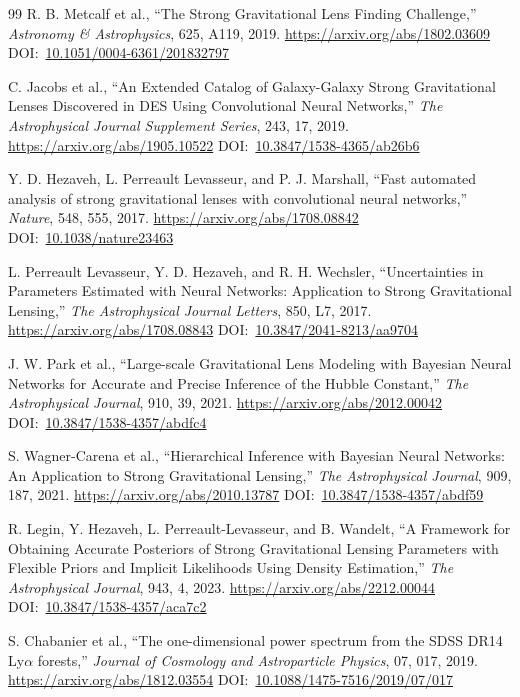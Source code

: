 \documentclass[10pt,onecolumn]{article}
\newcommand{\doi}[1]{DOI:~\href{https://doi.org/#1}{#1}}
\begin{document}
\begin{thebibliography}{99}
R. B. Metcalf et al.,
``The Strong Gravitational Lens Finding Challenge,''
\emph{Astronomy \& Astrophysics}, 625, A119, 2019.
\url{https://arxiv.org/abs/1802.03609}
\doi{10.1051/0004-6361/201832797}

C. Jacobs et al.,
``An Extended Catalog of Galaxy-Galaxy Strong Gravitational Lenses Discovered in DES Using Convolutional Neural Networks,''
\emph{The Astrophysical Journal Supplement Series}, 243, 17, 2019.
\url{https://arxiv.org/abs/1905.10522}
\doi{10.3847/1538-4365/ab26b6}

Y. D. Hezaveh, L. Perreault Levasseur, and P. J. Marshall,
``Fast automated analysis of strong gravitational lenses with convolutional neural networks,''
\emph{Nature}, 548, 555, 2017.
\url{https://arxiv.org/abs/1708.08842}
\doi{10.1038/nature23463}

L. Perreault Levasseur, Y. D. Hezaveh, and R. H. Wechsler,
``Uncertainties in Parameters Estimated with Neural Networks: Application to Strong Gravitational Lensing,''
\emph{The Astrophysical Journal Letters}, 850, L7, 2017.
\url{https://arxiv.org/abs/1708.08843}
\doi{10.3847/2041-8213/aa9704}

J. W. Park et al.,
``Large-scale Gravitational Lens Modeling with Bayesian Neural Networks for Accurate and Precise Inference of the Hubble Constant,''
\emph{The Astrophysical Journal}, 910, 39, 2021.
\url{https://arxiv.org/abs/2012.00042}
\doi{10.3847/1538-4357/abdfc4}

S. Wagner-Carena et al.,
``Hierarchical Inference with Bayesian Neural Networks: An Application to Strong Gravitational Lensing,''
\emph{The Astrophysical Journal}, 909, 187, 2021.
\url{https://arxiv.org/abs/2010.13787}
\doi{10.3847/1538-4357/abdf59}

R. Legin, Y. Hezaveh, L. Perreault-Levasseur, and B. Wandelt,
``A Framework for Obtaining Accurate Posteriors of Strong Gravitational Lensing Parameters with Flexible Priors and Implicit Likelihoods Using Density Estimation,''
\emph{The Astrophysical Journal}, 943, 4, 2023.
\url{https://arxiv.org/abs/2212.00044}
\doi{10.3847/1538-4357/aca7c2}

S. Chabanier et al.,
``The one-dimensional power spectrum from the SDSS DR14 Ly$\alpha$ forests,''
\emph{Journal of Cosmology and Astroparticle Physics}, 07, 017, 2019.
\url{https://arxiv.org/abs/1812.03554}
\doi{10.1088/1475-7516/2019/07/017}


\end{thebibliography}
\end{document}
